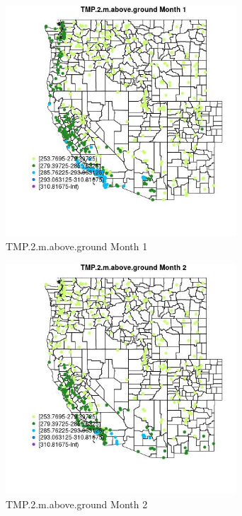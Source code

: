 \begin{figure} 
\centering  
\includegraphics[width=0.77\textwidth]{Code_Outputs/Report_ML_input_PM25_Step4_part_e_de_duplicated_aves_compiled_2019-05-18wNAs_MapObsMo1TMP2maboveground.jpg} 
\caption{\label{fig:Report_ML_input_PM25_Step4_part_e_de_duplicated_aves_compiled_2019-05-18wNAsMapObsMo1TMP2maboveground}TMP.2.m.above.ground Month 1} 
\end{figure} 
 

\begin{figure} 
\centering  
\includegraphics[width=0.77\textwidth]{Code_Outputs/Report_ML_input_PM25_Step4_part_e_de_duplicated_aves_compiled_2019-05-18wNAs_MapObsMo2TMP2maboveground.jpg} 
\caption{\label{fig:Report_ML_input_PM25_Step4_part_e_de_duplicated_aves_compiled_2019-05-18wNAsMapObsMo2TMP2maboveground}TMP.2.m.above.ground Month 2} 
\end{figure} 
 

